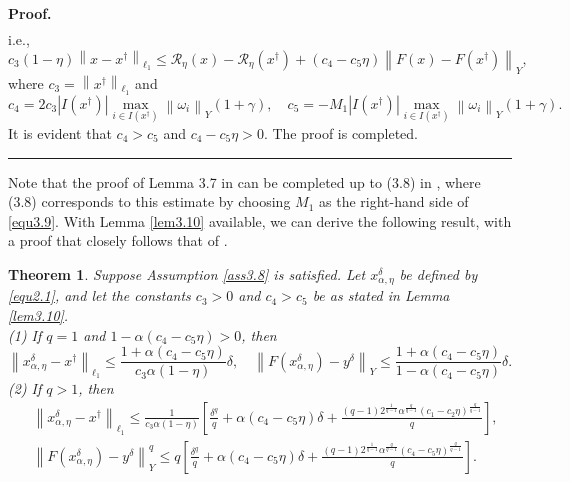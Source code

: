 \documentclass[a4paper,12pt]{article}
\newtheorem{theorem}{Theorem}[section]
\numberwithin{equation}{section}
\newenvironment{proof}[1][Proof]{\textbf{#1.} }
{\ \rule{0.75em}{0.75em}\smallskip}
\begin{document}
\begin{proof}
\begin{align}
    \end{align}
    i.e.,
    \begin{equation*}
        c_{3}\left(1-\eta\right)\left\|x-x^{\dagger}\right\|_{\ell_{1}}\leq \mathcal{R}_{\eta}\left(x\right)-\mathcal{R}_{\eta}\left(x^{\dagger}\right)+ \left(c_{4}-c_{5}\eta\right)\left\|F\left(x\right)- F\left(x^{\dagger}\right)\right\|_{Y},
    \end{equation*}
    where $c_{3}=\left\|x^{\dagger}\right\|_{\ell_{1}}$ and 
    \begin{equation*}
        c_{4}=2c_{3}\left|I\left(x^{\dagger}\right)\right|\max_{i\in I\left(x^{\dagger}\right)} \left\|\omega_{i}\right\|_{Y} \left(1+\gamma\right), \quad c_{5}=-M_{1}\left|I\left(x^{\dagger}\right)\right|\max_{i\in I\left(x^{\dagger}\right)} \left\|\omega_{i}\right\|_{Y} \left(1+\gamma\right).
    \end{equation*}
    It is evident that $c_{4}>c_{5}$ and $c_{4}-c_{5}\eta>0$. The proof is completed.
\end{proof}

\par Note that the proof of Lemma 3.7 in \cite{LD25} can be completed up to (3.8) in \cite{LD25}, where (3.8) corresponds to this estimate by choosing $M_{1}$ as the right-hand side of \eqref{equ3.9}. With Lemma \ref{lem3.10} available, we can derive the following result, with a proof that closely follows that of \cite[Theorem 2.18]{LD25}.

\begin{theorem}\label{the3.11}
    Suppose Assumption \ref{ass3.8} is satisfied. Let $x_{\alpha,\eta}^{\delta}$ be defined by \eqref{equ2.1}, and let the constants $c_{3}>0$ and $c_{4}>c_{5}$ be as stated in Lemma \ref{lem3.10}. \\
    (1) If $q=1$ and $1-\alpha\left(c_{4}-c_{5}\eta\right)>0$, then
    \begin{equation}\label{equ3.29}
        \left\|x_{\alpha,\eta}^{\delta}-x^{\dagger}\right\|_{\ell_{1}}\leq \frac{1+\alpha\left(c_{4}-c_{5}\eta\right)} {c_{3}\alpha\left(1-\eta\right)}\delta ,\quad \left\|F\left(x_{\alpha,\eta}^{\delta}\right)-y^{\delta}\right\|_{Y}\leq \frac{1+\alpha\left(c_{4}-c_{5}\eta\right)}{1- \alpha\left(c_{4}-c_{5}\eta\right)}\delta.
    \end{equation}
    (2) If $q>1$, then
    \begin{align}\label{equ3.30}
        & \left\|x_{\alpha,\eta}^{\delta}-x^{\dagger}\right\|_{\ell_{1}} \leq \frac{1}{c_{3}\alpha\left(1-\eta\right)} \left[\frac{\delta^{q}}{q}+\alpha\left(c_{4}-c_{5}\eta\right)\delta+ \frac{\left(q-1\right)2^{\frac{1}{q-1}} \alpha^{\frac{q}{q-1}} \left(c_{1}-c_{2}\eta\right)^{\frac{q}{q-1}}}{q}\right], \nonumber\\ 
        & \left\|F\left(x_{\alpha,\eta}^{\delta}\right)-y^{\delta}\right\|_{Y}^{q} \leq q  \left[\frac{\delta^{q}}{q}+\alpha\left(c_{4}-c_{5}\eta\right)\delta+ \frac{\left(q-1\right)2^{\frac{1}{q-1}} \alpha^{\frac{q}{q-1}} \left(c_{4}-c_{5}\eta\right)^{\frac{q}{q-1}}}{q}\right].
    \end{align}
\end{theorem}
\end{document}
